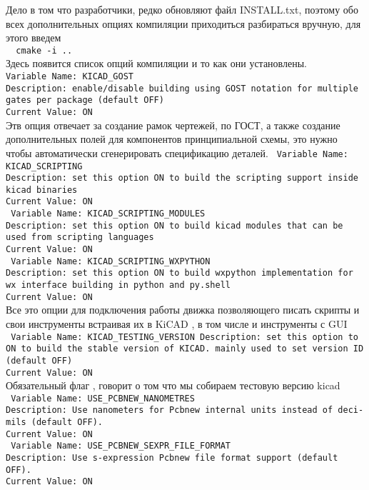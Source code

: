 Дело в том что разработчики, редко обновляют файл INSTALL.txt, поэтому обо всех дополнительных опциях компиляции приходиться разбираться вручную, для этого введем\\
\texttt{~ cmake -i ..}\\
Здесь появится список опций компиляции и то как они установлены.\\
\texttt{Variable Name: KICAD\_GOST\\
Description: enable/disable building using GOST notation for multiple gates per package (default OFF)\\
Current Value: ON}\\
Этв опция отвечает за создание рамок чертежей, по ГОСТ, а также создание дополнительных полей для компонентов принципиальной схемы, это нужно чтобы автоматически сгенерировать спецификацию деталей.
\texttt{
Variable Name: KICAD\_SCRIPTING\\
Description: set this option ON to build the scripting support inside kicad binaries\\
Current Value: ON
}\\
\texttt{
Variable Name: KICAD\_SCRIPTING\_MODULES\\
Description: set this option ON to build kicad modules that can be used from scripting languages\\
Current Value: ON
}\\
\texttt{
Variable Name: KICAD\_SCRIPTING\_WXPYTHON\\
Description: set this option ON to build wxpython implementation for wx interface building in python and py.shell\\
Current Value: ON
}\\
Все это опции для подключения работы движка позволяющего писать скрипты и свои инструменты встраивая их в KiCAD , в том числе и инструменты с GUI\\
\texttt{
Variable Name: KICAD\_TESTING\_VERSION
Description: set this option to ON to build the stable version of KICAD. mainly used to set version ID (default OFF)\\
Current Value: ON
}\\
Обязательный флаг , говорит о том что мы собираем тестовую версию kicad\\
\texttt{
Variable Name: USE\_PCBNEW\_NANOMETRES\\
Description: Use nanometers for Pcbnew internal units instead of deci-mils (default OFF).\\
Current Value: ON
}\\
\texttt{
Variable Name: USE\_PCBNEW\_SEXPR\_FILE\_FORMAT\\
Description: Use s-expression Pcbnew file format support (default OFF).\\
Current Value: ON
}\\
